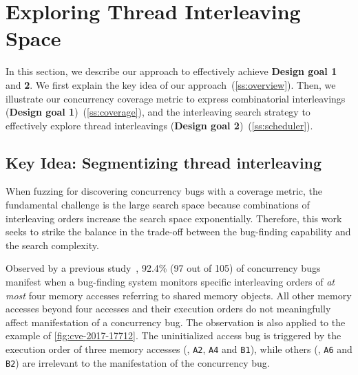 \section {Exploring Thread Interleaving Space}
\label{s:design}

In this section, we describe our approach to effectively achieve
\textbf{Design goal 1} and \textbf{2}.
%
We first explain the key idea of our approach~(\autoref{ss:overview}).
Then, we illustrate our concurrency coverage metric to express
combinatorial interleavings (\textbf{Design goal
  1})~(\autoref{ss:coverage}), and the interleaving search strategy to
effectively explore thread interleavings (\textbf{Design goal
  2})~(\autoref{ss:scheduler}).


\subsection{Key Idea: Segmentizing thread interleaving}
\label{ss:overview}


When fuzzing for discovering concurrency bugs with a coverage metric,
the fundamental challenge is the large search space because
combinations of interleaving orders increase the search space
exponentially.
%
Therefore, this work seeks to strike the balance in the trade-off
between the bug-finding capability and the search complexity.

Observed by a previous study~\cite{learningfrommistakes}, 92.4\% (97
out of 105) of concurrency bugs manifest when a bug-finding system
monitors specific interleaving orders of \textit{at most} four memory
accesses referring to shared memory objects.
%
All other memory accesses beyond four accesses and their execution
orders do not meaningfully affect manifestation of a concurrency bug.
%
The observation is also applied to the example of
\autoref{fig:cve-2017-17712}. The uninitialized access bug is
triggered by the execution order of three memory accesses (\eg,
\texttt{A2}, \texttt{A4} and \texttt{B1}), while others (\eg,
\texttt{A6} and \texttt{B2}) are irrelevant to the manifestation of
the concurrency bug.



